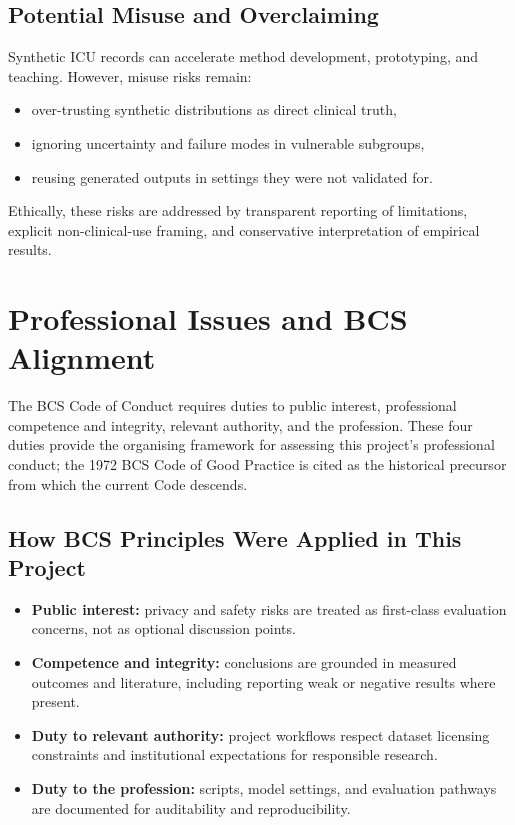\subsection{Potential Misuse and Overclaiming}

Synthetic ICU records can accelerate method development, prototyping, and teaching. However, misuse risks remain:
\begin{itemize}\tightlist
    \item over-trusting synthetic distributions as direct clinical truth,
    \item ignoring uncertainty and failure modes in vulnerable subgroups,
    \item reusing generated outputs in settings they were not validated for.
\end{itemize}

Ethically, these risks are addressed by transparent reporting of limitations, explicit non-clinical-use framing, and conservative interpretation of empirical results.

\section{Professional Issues and BCS Alignment}

The BCS Code of Conduct \cite{bcsCodeConduct2022} requires duties to public interest, professional competence and integrity, relevant authority, and the profession. These four duties provide the organising framework for assessing this project's professional conduct; the 1972 BCS Code of Good Practice \cite{bcsCodeGoodPractice1972} is cited as the historical precursor from which the current Code descends.

\subsection{How BCS Principles Were Applied in This Project}

\begin{itemize}\tightlist
    \item \textbf{Public interest:} privacy and safety risks are treated as first-class evaluation concerns, not as optional discussion points.
    \item \textbf{Competence and integrity:} conclusions are grounded in measured outcomes and literature, including reporting weak or negative results where present.
    \item \textbf{Duty to relevant authority:} project workflows respect dataset licensing constraints and institutional expectations for responsible research.
    \item \textbf{Duty to the profession:} scripts, model settings, and evaluation pathways are documented for auditability and reproducibility.
\end{itemize}

